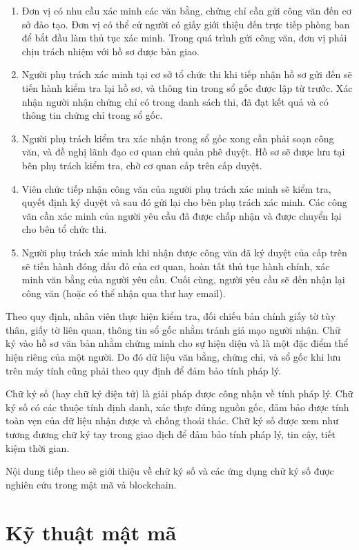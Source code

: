 \begin{enumerate}
\item Đơn vị có nhu cầu xác minh các văn bằng, chứng chỉ cần gửi công văn đến cơ sở đào tạo. Đơn vị có thể cử người có giấy giới thiệu đến trực tiếp phòng ban để bắt đầu làm thủ tục xác minh. Trong quá trình gửi công văn, đơn vị phải chịu trách nhiệm với hồ sơ được bàn giao.
\item Người phụ trách xác minh tại cơ sở tổ chức thi khi tiếp nhận hồ sơ gửi đến sẽ tiến hành kiểm tra lại hồ sơ, và thông tin trong sổ gốc được lập từ trước. Xác nhận người nhận chứng chỉ có trong danh sách thi, đã đạt kết quả và có thông tin chứng chỉ trong sổ gốc.
\item Người phụ trách kiểm tra xác nhận trong sổ gốc xong cần phải soạn công văn, và đề nghị lãnh đạo cơ quan chủ quản phê duyệt. Hồ sơ sẽ được lưu tại bên phụ trách kiểm tra, chờ cơ quan cấp trên cấp duyệt.
\item Viên chức tiếp nhận công văn của người phụ trách xác minh sẽ kiểm tra, quyết định ký duyệt và sau đó gửi lại cho bên phụ trách xác minh. Các công văn cần xác minh của người yêu cầu đã được chấp nhận và được chuyển lại cho bên tổ chức thi.
\item Người phụ trách xác minh khi nhận được công văn đã ký duyệt của cấp trên sẽ tiến hành đóng dấu đỏ của cơ quan, hoàn tất thủ tục hành chính, xác minh văn bằng của người yêu cầu. Cuối cùng, người yêu cầu sẽ đến nhận lại công văn (hoặc có thể nhận qua thư hay email).
\end{enumerate}

Theo quy định, nhân viên thực hiện kiểm tra, đối chiếu bản chính giấy tờ tùy thân, giấy tờ liên quan, thông tin sổ gốc nhằm tránh giả mạo người nhận. Chữ ký vào hồ sơ văn bản nhằm chứng minh cho sự hiện diện và là một đặc điểm thể hiện riêng của một người. Do đó dữ liệu văn bằng, chứng chỉ, và sổ gốc khi lưu trên máy tính cũng phải theo quy định để đảm bảo tính pháp lý.

Chữ ký số (hay chữ ký điện tử) là giải pháp được công nhận về tính pháp lý. Chữ ký số có các thuộc tính định danh, xác thực đúng nguồn gốc, đảm bảo được tính toàn vẹn của dữ liệu nhận được và chống thoái thác. Chữ ký số được xem như tương đương chữ ký tay trong giao dịch để đảm bảo tính pháp lý, tin cậy, tiết kiệm thời gian.

Nội dung tiếp theo sẽ giới thiệu về chữ ký số và các ứng dụng chữ ký số được nghiên cứu trong mật mã và blockchain.

\section{Kỹ thuật mật mã}

